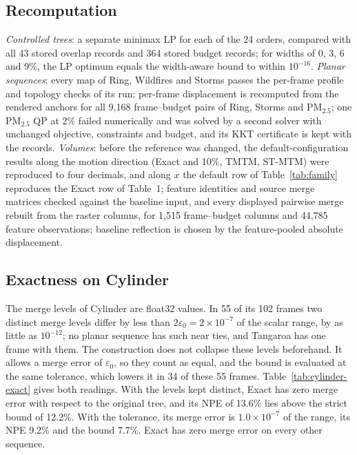 \documentclass[preprint]{vgtc}
\begin{document}
\subsection{Recomputation}\label{sec:recompute}
\emph{Controlled trees}: a separate minimax LP for each of the 24 orders, compared with all 43 stored overlap records and 364 stored budget records; for widths of 0, 3, 6 and 9\%, the LP optimum equals the width-aware bound to within $10^{-16}$. \emph{Planar sequences}: every map of Ring, Wildfires and Storms passes the per-frame profile and topology checks of its run; per-frame displacement is recomputed from the rendered anchors for all 9,168 frame--budget pairs of Ring, Storms and PM$_{2.5}$; one PM$_{2.5}$ QP at 2\% failed numerically and was solved by a second solver with unchanged objective, constraints and budget, and its KKT certificate is kept with the records. \emph{Volumes}: before the reference was changed, the default-configuration results along the motion direction (Exact and 10\%, TMTM, ST-MTM) were reproduced to four decimals, and along $x$ the default row of Table~\ref{tab:family} reproduces the Exact row of Table~1; feature identities and source merge matrices checked against the baseline input, and every displayed pairwise merge rebuilt from the raster columns, for 1,515 frame--budget columns and 44,785 feature observations; baseline reflection is chosen by the feature-pooled absolute displacement.

\subsection{Exactness on Cylinder}\label{sec:cylinder-exact}

The merge levels of Cylinder are float32 values. In 55 of its 102 frames two distinct merge levels differ by less than $2\varepsilon_0=2\times10^{-7}$ of the scalar range, by as little as $10^{-12}$; no planar sequence has such near ties, and Tangaroa has one frame with them. The construction does not collapse these levels beforehand. It allows a merge error of $\varepsilon_0$, so they count as equal, and the bound is evaluated at the same tolerance, which lowers it in 34 of these 55 frames. Table~\ref{tab:cylinder-exact} gives both readings. With the levels kept distinct, Exact has zero merge error with respect to the original tree, and its NPE of 13.6\% lies above the strict bound of 12.2\%. With the tolerance, its merge error is $1.0\times10^{-7}$ of the range, its NPE 9.2\% and the bound 7.7\%. Exact has zero merge error on every other sequence.
\end{document}
